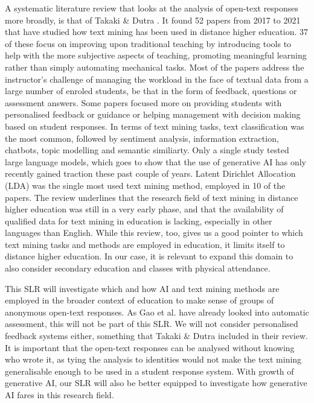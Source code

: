A systematic literature review that looks at the analysis of open-text responses more broadly, is that of Takaki \& Dutra \cite{textmininglitrev}. It found 52 papers from 2017 to 2021 that have studied how text mining has been used in distance higher education. 37 of these focus on improving upon traditional teaching by introducing tools to help with the more subjective aspects of teaching, promoting meaningful learning rather than simply automating mechanical tasks. Most of the papers address the instructor's challenge of managing the workload in the face of textual data from a large number of enroled students, be that in the form of feedback, questions or assessment answers. Some papers focused more on providing students with personalised feedback or guidance or helping management with decision making based on student responses. In terms of text mining tasks, text classification was the most common, followed by sentiment analysis, information extraction, chatbots, topic modelling and semantic similiarty. Only a single study tested large language models, which goes to show that the use of generative AI has only recently gained traction these past couple of years. Latent Dirichlet Allocation (LDA) was the single most used text mining method, employed in 10 of the papers. The review underlines that the research field of text mining in distance higher education was still in a very early phase, and that the availability of qualified data for text mining in education is lacking, especially in other languages than English. While this review, too, gives us a good pointer to which text mining tasks and methods are employed in education, it limits itself to distance higher education. In our case, it is relevant to expand this domain to also consider secondary education and classes with physical attendance.

This SLR will investigate which and how AI and text mining methods are employed in the broader context of education to make sense of groups of anonymous open-text responses. As Gao et al. \cite{autoassessmentlitrev} have already looked into automatic assessment, this will not be part of this SLR. We will not consider personalised feedback systems either, something that Takaki \& Dutra \cite{textmininglitrev} included in their review. It is important that the open-text responses can be analysed without knowing who wrote it, as tying the analysis to identities would not make the text mining generalisable enough to be used in a student response system. With growth of generative AI, our SLR will also be better equipped to investigate how generative AI fares in this research field.

